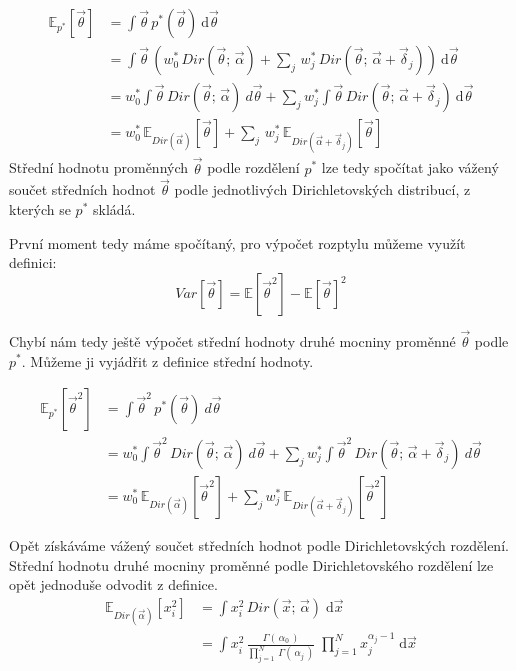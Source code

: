 \begin{align}
\mathbb{E}_{p^*}[\vec\theta] &= \int \vec\theta \, p^*(\vec\theta) ~ \mathrm{d}\vec\theta
\\
&= \int \vec\theta \, (
	w_0^* \, Dir(\vec{\theta};\, \vec{\alpha}) +
	\sum_j \, w^*_j \,
        	Dir(\vec{\theta};\, \vec{\alpha} + \vec{\delta}_j)
    ) ~ \mathrm{d}\vec\theta
\\
&= w_0^* \int \vec\theta \, Dir(\vec{\theta};\, \vec{\alpha}) ~ d\vec\theta +
	\sum_j w_j^* \int \vec\theta \, Dir(\vec{\theta};\, \vec{\alpha} + \vec{\delta}_j)
    ~ \mathrm{d}\vec\theta
\\
&= w_0^* \, \mathbb{E}_{Dir(\vec\alpha)}[\vec\theta] +
	\sum_j \, w_j^* \, \mathbb{E}_{Dir(\vec\alpha + \vec{\delta}_j)}[\vec\theta]
\end{align}
Střední hodnotu proměnných $\vec\theta$ podle rozdělení $p^*$ lze tedy spočítat
jako vážený součet středních hodnot $\vec\theta$ podle jednotlivých
Dirichletovských distribucí, z kterých se $p^*$ skládá.

První moment tedy máme spočítaný, pro výpočet rozptylu můžeme využít
definici:
\begin{equation}
	Var[\vec{\theta}] = \mathbb{E}[\vec{\theta}^2] - \mathbb{E}[\vec\theta]^2
\end{equation}

Chybí nám tedy ještě výpočet střední hodnoty druhé mocniny proměnné
$\vec\theta$ podle $p^*$. Můžeme ji vyjádřit z definice střední hodnoty.

\begin{align}
\mathbb{E}_{p^*}[\vec\theta^2] &= \int \vec\theta^2 \, p^*(\vec\theta) ~ d\vec\theta
\\
&= w_0^* \int \vec\theta^2 \, Dir(\vec{\theta};\, \vec{\alpha}) ~ d\vec\theta +
	\sum_j w_j^* \int \vec\theta^2 \, Dir(\vec{\theta};\, \vec{\alpha} + \vec{\delta}_j)
	 ~ d\vec\theta
\\
&= w_0^* \, \mathbb{E}_{Dir(\vec\alpha)}[\vec\theta^2] +
	\sum_j w_j^* \, \mathbb{E}_{Dir(\vec\alpha + \vec{\delta}_j)}[\vec\theta^2]
\end{align}

Opět získáváme vážený součet středních hodnot podle Dirichletovských rozdělení.
Střední hodnotu druhé mocniny proměnné podle Dirichletovského rozdělení
lze opět jednoduše odvodit z definice.
\begin{align}
\mathbb{E}_{Dir(\vec\alpha)}[x_i^2] &=
	\int x_i^2 \, Dir(\vec x; \, \vec\alpha) \; \mathrm{d}\vec x
\\
&=
	\int x_i^2 \, \frac{\Gamma(\,\alpha_0\,)}
			   {\prod_{j=1}^N \, \Gamma(\,\alpha_j\,)} \;
		\prod_{j=1}^N x_j^{\alpha_j - 1} \; \mathrm{d}\vec x
\end{align}

